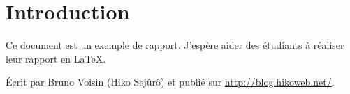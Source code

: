 \part*{Introduction} %

Ce document est un exemple de rapport. J'espère aider des étudiants à réaliser leur rapport en \LaTeX.

Écrit par Bruno Voisin (Hiko Sejûrô) et publié sur \url{http://blog.hikoweb.net/}.
